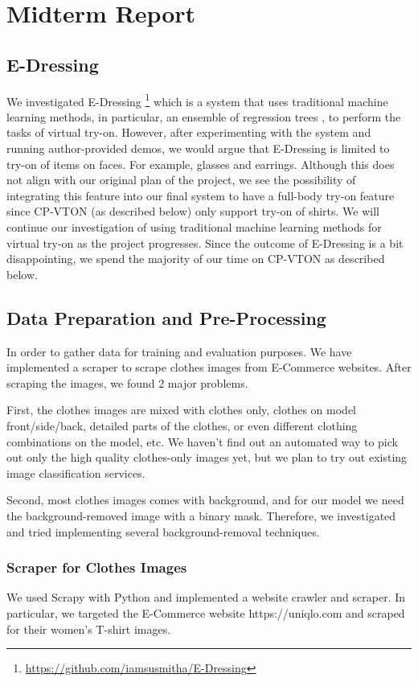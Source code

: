 \documentclass{article}
\begin{document}
\section{Midterm Report} \label{mid-report}

\subsection{E-Dressing} 
We investigated E-Dressing \footnote{\url{https://github.com/iamsusmitha/E-Dressing}} which is a system that uses traditional machine learning methods, in particular, an ensemble of regression trees \cite{kazemi2014one}, to perform the tasks of virtual try-on. However, after experimenting with the system and running author-provided demos, we would argue that E-Dressing is limited to try-on of items on faces. For example, glasses and earrings. Although this does not align with our original plan of the project, we see the possibility of integrating this feature into our final system to have a full-body try-on feature since CP-VTON (as described below) only support try-on of shirts. We will continue our investigation of using traditional machine learning methods for virtual try-on as the project progresses. Since the outcome of E-Dressing is a bit disappointing, we spend the majority of our time on CP-VTON as described below.

\subsection{Data Preparation and Pre-Processing}
In order to gather data for training and evaluation purposes. We have implemented a scraper to scrape clothes images from E-Commerce websites. After scraping the images, we found 2 major problems.

First, the clothes images are mixed with clothes only, clothes on model front/side/back, detailed parts of the clothes, or even different clothing combinations on the model, etc. We haven't find out an automated way to pick out only the high quality clothes-only images yet, but we plan to try out existing image classification services.

Second, most clothes images comes with background, and for our model we need the background-removed image with a binary mask. Therefore, we investigated and tried implementing several background-removal techniques.

\subsubsection{Scraper for Clothes Images}
We used Scrapy with Python and implemented a website crawler and scraper. In particular, we targeted the E-Commerce website https://uniqlo.com and scraped for their women's T-shirt images.
\end{document}

